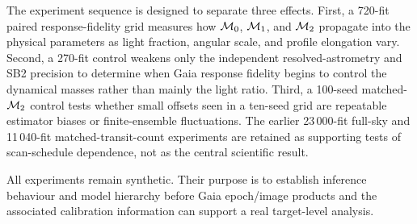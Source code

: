 The experiment sequence is designed to separate three effects. First, a 720-fit paired response-fidelity grid measures how $\mathcal{M}_0$, $\mathcal{M}_1$, and $\mathcal{M}_2$ propagate into the physical parameters as light fraction, angular scale, and profile elongation vary. Second, a 270-fit control weakens only the independent resolved-astrometry and SB2 precision to determine when Gaia response fidelity begins to control the dynamical masses rather than mainly the light ratio. Third, a 100-seed matched-$\mathcal{M}_2$ control tests whether small offsets seen in a ten-seed grid are repeatable estimator biases or finite-ensemble fluctuations. The earlier 23\,000-fit full-sky and 11\,040-fit matched-transit-count experiments are retained as supporting tests of scan-schedule dependence, not as the central scientific result.

All experiments remain synthetic. Their purpose is to establish inference behaviour and model hierarchy before Gaia epoch/image products and the associated calibration information can support a real target-level analysis.
